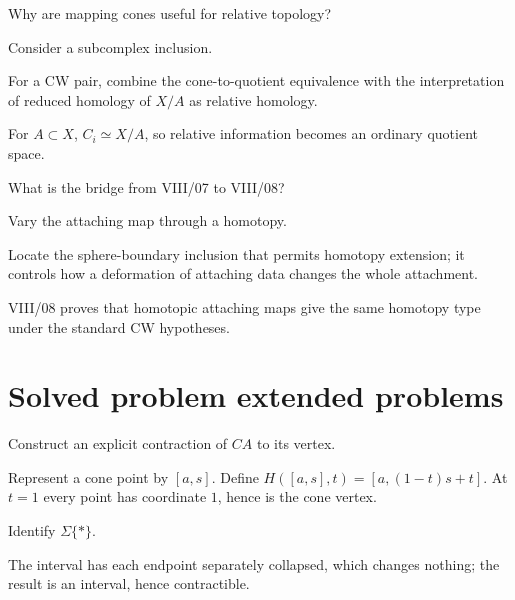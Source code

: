 \begin{exercise}\label{exr:viii07-23}
Why are mapping cones useful for relative topology?
\end{exercise}
\begin{hint}
Consider a subcomplex inclusion.

For a CW pair, combine the cone-to-quotient equivalence with the interpretation of reduced homology of \(X/A\) as relative homology.
\end{hint}
\begin{solution}
For \(A\subset X\), \(C_i\simeq X/A\), so relative information becomes an ordinary quotient space.
\end{solution}

\begin{exercise}\label{exr:viii07-24}
What is the bridge from VIII/07 to VIII/08?
\end{exercise}
\begin{hint}
Vary the attaching map through a homotopy.

Locate the sphere-boundary inclusion that permits homotopy extension; it controls how a deformation of attaching data changes the whole attachment.
\end{hint}
\begin{solution}
VIII/08 proves that homotopic attaching maps give the same homotopy type under the standard CW hypotheses.
\end{solution}


\section{Solved problem extended problems}

\begin{problem}\label{prob:viii07-01}
Construct an explicit contraction of \(CA\) to its vertex.
\end{problem}
\begin{solution}
Represent a cone point by \([a,s]\).  Define \(H([a,s],t)=[a,(1-t)s+t]\).  At \(t=1\) every point has coordinate \(1\), hence is the cone vertex.
\end{solution}

\begin{problem}\label{prob:viii07-02}
Identify \(\Sigma\{*\}\).
\end{problem}
\begin{solution}
The interval has each endpoint separately collapsed, which changes nothing; the result is an interval, hence contractible.
\end{solution}

